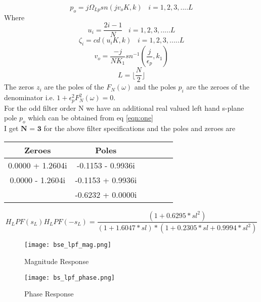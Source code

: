 \documentclass[12pt]{article}
\begin{document}
\begin{equation*}
    p_o = j\Omega_{Lp}sn(jv_oK,k) \; \; \; i = 1,2,3,....L
\end{equation*}
Where 
\begin{equation*}
    u_i = \frac{2i-1}{N} \; \; \; i = 1,2,3,.....L
\end{equation*}
\begin{equation*}
    \zeta_i = cd(u_iK, k)\; \; \;i = 1, 2,3,.....L
\end{equation*}
\begin{equation*}
    v_o = \frac{-j}{NK_1}sn^{-1}(\frac{j}{\epsilon_p},k_1)
\end{equation*}
\begin{equation*}
    L = \lfloor \frac{N}{2} \rfloor
\end{equation*}
The zeros $z_i$ are the poles of the $F_N(\omega)$ and the poles $p_i$ are the zeroes of the denominator i.e. $1+\epsilon_p^2F_N^2(\omega)=0$.\\
For the odd filter order N we have an additional real valued left hand s-plane pole $p_o$ which can be obtained from eq \ref{eqn:one}\\
I get $\textbf{N = 3 }$for the above filter specifications and the poles and zeroes  are\\

\begin{table}[!hbt]
		\begin{center}
		\begin{tabular}{|c|c|c|c|c|c|}
			\hline
			  Zeroes & Poles \\
			\hline
		0.0000 + 1.2604i &  -0.1153 - 0.9936i\\
			\hline
			 0.0000 - 1.2604i &  -0.1153 + 0.9936i\\
			\hline
			  &  -0.6232 + 0.0000i\\
			\hline
		    
		\end{tabular}
		\end{center}
\end{table}

\begin{equation*}
    H_LPF(s_L)H_LPF(-s_L) = \frac{(1 + 0.6295*sl^2)}{(1 + 1.6047 * sl) * (1 + 0.2305 * sl + 0.9994 * sl^2)}
\end{equation*}
\begin{figure}[H]
\centering
\texttt{[image: bse\_lpf\_mag.png]}
\caption{Magnitude Response}
\label{fig:mesh2}
\end{figure}
\begin{figure}[H]
\centering
\texttt{[image: bs\_lpf\_phase.png]}
\caption{Phase Response}
\label{fig:mesh2}
\end{figure}
\end{document}
